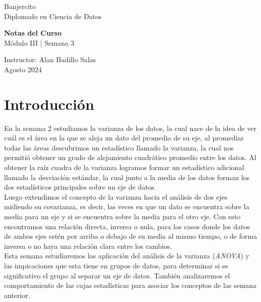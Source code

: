 \documentclass{article}
\begin{document}
\begin{center}
    \Large Banjercito \\[24pt]
    \Large Diplomado en Ciencia de Datos
\end{center}

\vfill

\begin{flushleft}
    \LARGE \textbf{Notas del Curso} \\[12pt]
    \LARGE Módulo III | Semana 3 \\[24pt]
\end{flushleft}

\vfil

\begin{flushleft}
    Instructor: Alan Badillo Salas \\[12pt]
    Agosto 2024 \\[24pt]
\end{flushleft}

\vfill

\section{Introducción}
En la semana 2 estudiamos la varianza de los datos, la cual nace de la idea de ver cuál es el área en la que se aleja un dato del promedio de su eje, al promediar todas las áreas descubrimos un estadístico llamado la varianza, la cual nos permitió obtener un grado de alejamiento cuadrático promedio entre los datos. Al obtener la raíz cuadra de la varianza logramos formar un estadístico adicional llamado la desviación estándar, la cual junto a la media de los datos forman los dos estadísticos principales sobre un eje de datos.
\\[12pt]
Luego extendimos el concepto de la varianza hacia el análisis de dos ejes midiendo su covarianza, es decir, las veces en que un dato se encuentra sobre la media para un eje y si se encuentra sobre la media para el otro eje. Con esto encontramos una relación directa, inversa o nula, para los casos donde los datos de ambos ejes estén por arriba o debajo de su media al mismo tiempo, o de forma inversa o no haya una relación clara entre los cambios.
\\[12pt]
Esta semana estudiaremos las aplicación del análisis de la varianza (\textit{ANOVA}) y las impicaciones que esta tiene en grupos de datos, para determinar si es significativo el grupo al separar un eje de datos. También analizaremos el comportamiento de las cajas estadísticas para asociar los conceptos de las semana anterior.
\end{document}
